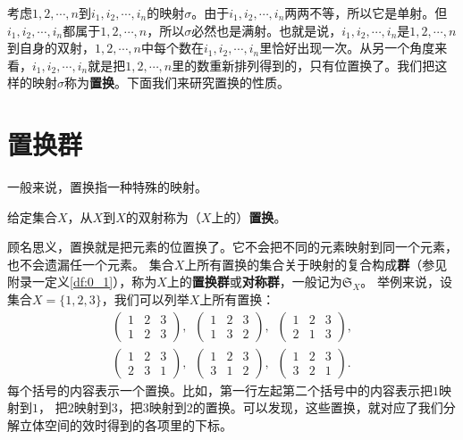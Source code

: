 \documentclass[12pt,UTF8,fontset=none]{ctexbook}
\begin{document}
考虑$1,2,\cdots, n$到$i_1,i_2,\cdots,i_n$的映射$\sigma$。由于$i_1,i_2,\cdots,i_n$两两不等，所以它是单射。但$i_1,i_2,\cdots,i_n$都属于$1,2,\cdots,n$，所以$\sigma$必然也是满射。也就是说，$i_1,i_2,\cdots,i_n$是$1,2,\cdots,n$到自身的双射，$1,2,\cdots,n$中每个数在$i_1,i_2,\cdots,i_n$里恰好出现一次。从另一个角度来看，$i_1,i_2,\cdots,i_n$就是把$1,2,\cdots,n$里的数重新排列得到的，只有位置换了。我们把这样的映射$\sigma$称为\textbf{置换}。下面我们来研究置换的性质。

\section{置换群}

一般来说，置换指一种特殊的映射。
\begin{df}\label{df:10_1}
    给定集合$X$，从$X$到$X$的双射称为（$X$上的）\textbf{置换}。
\end{df}
顾名思义，置换就是把元素的位置换了。它不会把不同的元素映射到同一个元素，也不会遗漏任一个元素。
集合$X$上所有置换的集合关于映射的复合构成\textbf{群}（参见附录一定义\ref{df:0_1}），称为$X$上的\textbf{置换群}或\textbf{对称群}，一般记为$\mathfrak{S}_X$。
举例来说，设集合$X = \{1, 2, 3\}$，我们可以列举$X$上所有置换：
\begin{align*}
    \begin{pmatrix}
    1 & 2 & 3 \\ 1 & 2 & 3
    \end{pmatrix}, \,\,\,\begin{pmatrix}
        1 & 2 & 3 \\ 1 & 3 & 2
    \end{pmatrix}, \,\,\,\begin{pmatrix}
        1 & 2 & 3 \\ 2 & 1 & 3
    \end{pmatrix},  \\
    \begin{pmatrix}
        1 & 2 & 3 \\ 2 & 3 & 1
    \end{pmatrix}, \,\,\,\begin{pmatrix}
        1 & 2 & 3 \\ 3 & 1 & 2
    \end{pmatrix}, \,\,\,\begin{pmatrix}
        1 & 2 & 3 \\ 3 & 2 & 1
    \end{pmatrix}.  
\end{align*}
每个括号的内容表示一个置换。比如，第一行左起第二个括号中的内容表示把$1$映射到$1$，
把$2$映射到$3$，把$3$映射到$2$的置换。可以发现，这些置换，就对应了我们分解立体空间的效时得到的各项里的下标。
\end{document}
